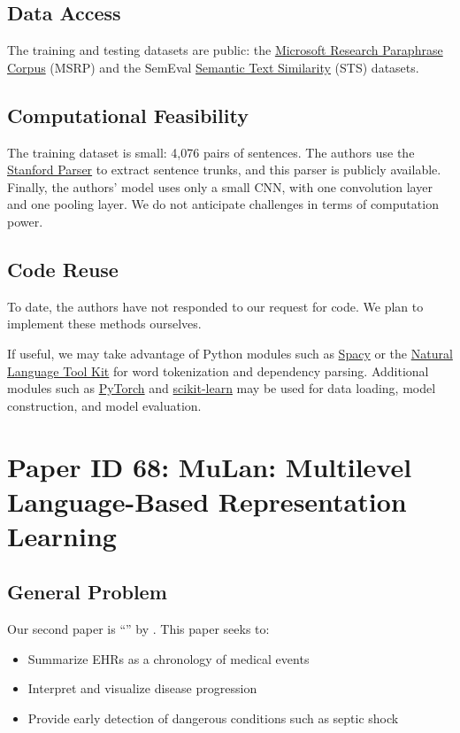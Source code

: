 \documentclass[11pt,a4paper]{article}
\begin{document}
\subsection{Data Access}
The training and testing datasets are public: the \href{https://www.microsoft.com/en-us/download/details.aspx?id=52398}{Microsoft Research Paraphrase Corpus} (MSRP) and the SemEval \href{https://github.com/brmson/dataset-sts/tree/master/data/sts/semeval-sts}{Semantic Text Similarity} (STS) datasets.

\subsection{Computational Feasibility}
The training dataset is small: 4,076 pairs of sentences. The authors use the \href{https://nlp.stanford.edu/software/lex-parser.shtml}{Stanford Parser} to extract sentence trunks, and this parser is publicly available. Finally, the authors' model uses only a small CNN, with one convolution layer and one pooling layer. We do not anticipate challenges in terms of computation power. 

\subsection{Code Reuse}
To date, the authors have not responded to our request for code. We plan to implement these methods ourselves. 

If useful, we may take advantage of Python modules such as \href{https://spacy.io/}{Spacy} or the \href{https://www.nltk.org/}{Natural Language Tool Kit} for word tokenization and dependency parsing. Additional modules such as \href{https://pytorch.org/}{PyTorch} and \href{https://scikit-learn.org/stable/}{scikit-learn} may be used for data loading, model construction, and model evaluation. 

\section{Paper ID 68: MuLan: Multilevel Language-Based Representation Learning}
\subsection{General Problem}
Our second paper is ``'' by \citeauthor*{sohn_2020}. This paper seeks to:
\begin{itemize}
  \item Summarize EHRs as a chronology of medical events
  \item Interpret and visualize disease progression
  \item Provide early detection of dangerous conditions such as septic shock
\end{itemize}
\end{document}

